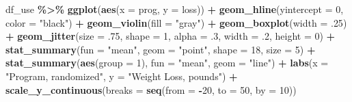 \documentclass[
]{article}
\newenvironment{Shaded}{\begin{snugshade}}{\end{snugshade}}
\newcommand{\AttributeTok}[1]{\textcolor[rgb]{0.13,0.29,0.53}{#1}}
\newcommand{\DecValTok}[1]{\textcolor[rgb]{0.00,0.00,0.81}{#1}}
\newcommand{\FunctionTok}[1]{\textcolor[rgb]{0.13,0.29,0.53}{\textbf{#1}}}
\newcommand{\NormalTok}[1]{#1}
\newcommand{\SpecialCharTok}[1]{\textcolor[rgb]{0.81,0.36,0.00}{\textbf{#1}}}
\newcommand{\StringTok}[1]{\textcolor[rgb]{0.31,0.60,0.02}{#1}}
\begin{document}
\begin{Shaded}
\begin{Highlighting}[]
\NormalTok{df\_use }\SpecialCharTok{\%\textgreater{}\%} 
  \FunctionTok{ggplot}\NormalTok{(}\FunctionTok{aes}\NormalTok{(}\AttributeTok{x =}\NormalTok{ prog,}
             \AttributeTok{y =}\NormalTok{ loss)) }\SpecialCharTok{+} 
  \FunctionTok{geom\_hline}\NormalTok{(}\AttributeTok{yintercept =} \DecValTok{0}\NormalTok{, }\AttributeTok{color =} \StringTok{"black"}\NormalTok{) }\SpecialCharTok{+}
  \FunctionTok{geom\_violin}\NormalTok{(}\AttributeTok{fill =} \StringTok{"gray"}\NormalTok{) }\SpecialCharTok{+}
  \FunctionTok{geom\_boxplot}\NormalTok{(}\AttributeTok{width =}\NormalTok{ .}\DecValTok{25}\NormalTok{) }\SpecialCharTok{+}
  \FunctionTok{geom\_jitter}\NormalTok{(}\AttributeTok{size =}\NormalTok{ .}\DecValTok{75}\NormalTok{,}
              \AttributeTok{shape =} \DecValTok{1}\NormalTok{,}
              \AttributeTok{alpha =}\NormalTok{ .}\DecValTok{3}\NormalTok{,}
              \AttributeTok{width =}\NormalTok{ .}\DecValTok{2}\NormalTok{,}
              \AttributeTok{height =} \DecValTok{0}\NormalTok{) }\SpecialCharTok{+}
  \FunctionTok{stat\_summary}\NormalTok{(}\AttributeTok{fun =} \StringTok{"mean"}\NormalTok{,}
               \AttributeTok{geom =} \StringTok{"point"}\NormalTok{,}
               \AttributeTok{shape =} \DecValTok{18}\NormalTok{,}
               \AttributeTok{size =} \DecValTok{5}\NormalTok{) }\SpecialCharTok{+}
  \FunctionTok{stat\_summary}\NormalTok{(}\FunctionTok{aes}\NormalTok{(}\AttributeTok{group =} \DecValTok{1}\NormalTok{),}
               \AttributeTok{fun =} \StringTok{"mean"}\NormalTok{,}
               \AttributeTok{geom =} \StringTok{"line"}\NormalTok{) }\SpecialCharTok{+}
  \FunctionTok{labs}\NormalTok{(}\AttributeTok{x =} \StringTok{"Program, randomized"}\NormalTok{,}
       \AttributeTok{y =} \StringTok{"Weight Loss, pounds"}\NormalTok{) }\SpecialCharTok{+}
  \FunctionTok{scale\_y\_continuous}\NormalTok{(}\AttributeTok{breaks =} \FunctionTok{seq}\NormalTok{(}\AttributeTok{from =} \SpecialCharTok{{-}}\DecValTok{20}\NormalTok{, }\AttributeTok{to =} \DecValTok{50}\NormalTok{, }\AttributeTok{by =} \DecValTok{10}\NormalTok{))}
\end{Highlighting}
\end{Shaded}
\end{document}
